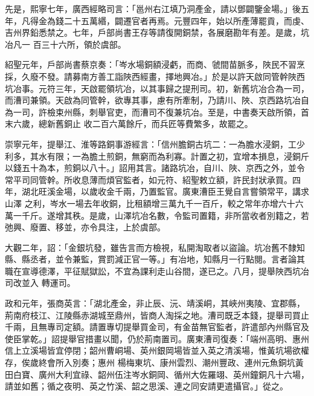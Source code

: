 \begin{pinyinscope}
 先是，熙寧七年，廣西經略司言：「邕州右江填乃洞產金，請以鄧闢鑒金場。」後五年，凡得金為錢二十五萬緡，闢遷官者再焉。元豐四年，始以所產薄罷貢，而虔、吉州界鉛悉禁之。七年，戶部尚書王存等請復開銅禁，各展磨勘年有差。是歲，坑冶凡一
 百三十六所，領於虞部。



 紹聖元年，戶部尚書蔡京奏：「岑水場銅額浸虧，而商、虢間苗脈多，陜民不習烹採，久廢不發。請募南方善工詣陜西經畫，擇地興冶。」於是以許天啟同管幹陜西坑冶事。元符三年，天啟罷領坑冶，以其事歸之提刑司。初，新舊坑冶合為一司，而漕司兼領。天啟為同管幹，欲專其事，慮有所牽制，乃請川、陜、京西路坑冶自為一司，許檢束州縣，刺舉官吏，而漕司不復兼坑冶。至是，中書奏天啟所領，首末六歲，總新舊銅止
 收二百六萬餘斤，而兵匠等費繁多，故罷之。



 崇寧元年，提舉江、淮等路銅事游經言：「信州膽銅古坑二：一為膽水浸銅，工少利多，其水有限；一為膽土煎銅，無窮而為利寡。計置之初，宜增本損息，浸銅斤以錢五十為本，煎銅以八十。」詔用其言。諸路坑冶，自川、陜、京西之外，並令常平司同管幹。所收息薄而煩官監者，如元符、紹聖敕立額，許民封狀承買。四年，湖北旺溪金場，以歲收金千兩，乃置監官。廣東漕臣王覺自言嘗領常平，講求山澤
 之利，岑水一場去年收銅，比租額增三萬九千一百斤，較之常年亦增六十六萬一千斤。遂增其秩。是歲，山澤坑冶名數，令監司置籍，非所當收者別籍之，若弛興、廢置、移並，亦令具注，上於虞部。



 大觀二年，詔：「金銀坑發，雖告言而方檢視，私開淘取者以盜論。坑冶舊不隸知縣、縣丞者，並令兼監，賞罰減正官一等。」有冶地，知縣月一行點閱。言者論其職在宣導德澤，平征賦獄訟，不宜為課利走山谷間，遂已之。八月，提舉陜西坑冶司改並入
 轉運司。



 政和元年，張商英言：「湖北產金，非止辰、沅、靖溪峒，其峽州夷陵、宜郡縣，荊南府枝江、江陵縣赤湖城至鼎州，皆商人淘採之地。漕司既乏本錢，提舉司買止千兩，且無專司定額。請置專切提舉買金司，有金苗無官監者，許遣部內州縣官及使臣掌乾。」詔提舉官措畫以聞，仍於荊南置司。廣東漕司復奏：「端州高明、惠州信上立溪場皆宜停閉；韶州曹峒場、英州銀岡場皆並入英之清溪場，惟黃坑場欲權存，俟歲終會所入別奏；惠州
 楊梅東坑、康州雲烈、潮州豐政、連州元魚銅坑黃田白寶、廣州大利宜祿、韶州伍注岑水銅岡、循州大佐羅翊、英州鐘銅凡十六場，請並如舊；循之夜明、英之竹溪、韶之思溪、連之同安請更遣攝官。」從之。




\end{pinyinscope}

